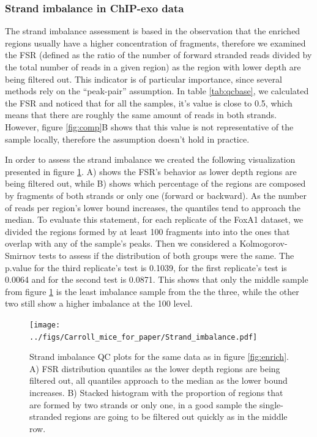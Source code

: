\documentclass[11pt]{article}\usepackage[]{graphicx}\usepackage[]{color}
\begin{document}

\subsubsection{Strand imbalance in ChIP-exo data}
\label{sec:strand_imbalance}

The strand imbalance assessment is based in the observation that the
enriched regions usually have a higher concentration of fragments,
therefore we examined the FSR (defined as the ratio of the number of
forward stranded reads divided by the total number of reads in a given
region) as the region with lower depth are being filtered out. This
indicator is of particular importance, since several methods rely on
the ``peak-pair'' assumption. In table \ref{tab:qcbase}, we calculated
the FSR and noticed that for all the samples, it's value is close to
0.5, which means that there are roughly the same amount of reads in
both strands. However, figure \ref{fig:comp}B shows that this value is
not representative of the sample locally, therefore the assumption
doesn't hold in practice.



In order to assess the strand imbalance we created the following
visualization presented in figure \ref{fig:strand}. A) shows the FSR's
behavior as lower depth regions are being filtered out, while B) shows
which percentage of the regions are composed by fragments of both
strands or only one (forward or backward). As the number of reads per
region's lower bound increases, the quantiles tend to approach the
median. To evaluate this statement, for each replicate of the FoxA1
dataset, we divided the regions formed by at least 100
fragments into into the ones that overlap with any of the sample's
peaks. Then we considered a Kolmogorov-Smirnov tests to assess if the
distribution of both groups were the same. The p.value for the third
replicate's test is 0.1039, for the first replicate's test
is 0.0064 and for the second test is
0.0871. This shows that only the middle sample from figure
\ref{fig:strand} is the least imbalance sample from the the three,
while the other two still show a higher imbalance at the 100
level.

\begin{figure}[H]
  \centering  
  \texttt{[image: ../figs/Carroll\_mice\_for\_paper/Strand\_imbalance.pdf]} 
  \caption{Strand imbalance QC plots for the same data as in figure
    \ref{fig:enrich}. A) FSR distribution quantiles as the lower depth
    regions are being filtered out, all quantiles approach to the
    median as the lower bound increases. B) Stacked histogram with the
    proportion of regions that are formed by two strands or only one,
    in a good sample the single-stranded regions are going to be
    filtered out quickly as in the middle row.}
  \label{fig:strand}
\end{figure}
\end{document}
